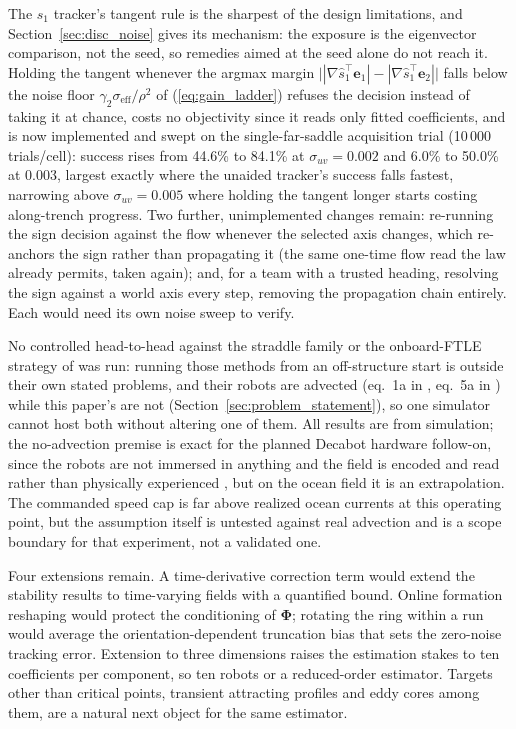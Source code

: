 \documentclass[lettersize,journal]{IEEEtran}
\begin{document}
The $s_1$ tracker's tangent rule is the sharpest of the design
limitations, and Section~\ref{sec:disc_noise} gives its mechanism: the
exposure is the eigenvector comparison, not the seed, so remedies aimed
at the seed alone do not reach it. Holding the tangent whenever the
argmax margin $\bigl||\nabla\hat{s}_1^\top\mathbf{e}_1| -
|\nabla\hat{s}_1^\top\mathbf{e}_2|\bigr|$ falls below the noise floor
$\gamma_2\sigma_{\mathrm{eff}}/\rho^2$ of (\ref{eq:gain_ladder}) refuses
the decision instead of taking it at chance, costs no objectivity since
it reads only fitted coefficients, and is now implemented and swept on
the single-far-saddle acquisition trial (10\,000 trials/cell): success
rises from 44.6\% to 84.1\% at $\sigma_{uv} = 0.002$ and 6.0\% to
50.0\% at 0.003, largest exactly where the unaided tracker's success
falls fastest, narrowing above $\sigma_{uv} = 0.005$ where holding the
tangent longer starts costing along-trench progress. Two further,
unimplemented changes remain: re-running the sign decision against the
flow whenever the selected axis changes, which re-anchors the sign
rather than propagating it (the same one-time flow read the law already
permits, taken again); and, for a team with a trusted heading, resolving
the sign against a world axis every step, removing the propagation
chain entirely. Each would need its own noise sweep to verify.

No controlled head-to-head against the straddle family \cite{17,18,19} or
the onboard-FTLE strategy of \cite{21} was run: running those methods
from an off-structure start is outside their own stated problems, and
their robots are advected (eq.~1a in \cite{17}, eq.~5a in \cite{21})
while this paper's are not (Section~\ref{sec:problem_statement}), so
one simulator cannot host both without altering one of them. All
results are from simulation; the no-advection premise is exact for the
planned Decabot hardware follow-on, since the robots are not immersed
in anything and the field is encoded and read rather than physically
experienced \cite{39}, but on the ocean field it is an extrapolation.
The commanded speed cap is far above realized ocean currents at this
operating point, but the assumption itself is untested against real
advection and is a scope boundary for that experiment, not a validated
one.

Four extensions remain. A time-derivative correction term would extend
the stability results to time-varying fields with a quantified bound.
Online formation reshaping would protect the conditioning of
$\boldsymbol{\Phi}$; rotating the ring within a run would average the
orientation-dependent truncation bias that sets the zero-noise tracking
error. Extension to three dimensions raises the estimation stakes to
ten coefficients per component, so ten robots or a reduced-order
estimator. Targets other than critical points, transient attracting
profiles and eddy cores among them, are a natural next object for the
same estimator.
\end{document}
